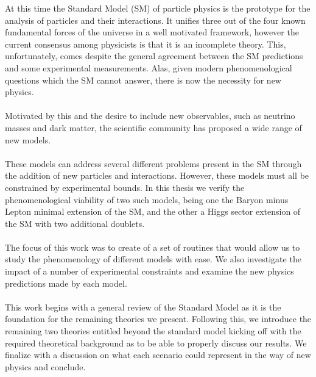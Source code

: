 \documentclass[10pt]{report}
\begin{document}
\TitlePage
\vspace*{55mm}
{At this time the Standard Model (SM) of particle physics is the prototype for the analysis of particles and their interactions. 
%
It unifies three out of the four known fundamental forces of the universe in a well motivated framework, however the current consensus among physicists is that it is an incomplete theory. 
%
This, unfortunately, comes despite the general agreement between the SM predictions and some experimental measurements. 
%
Alas, given modern phenomenological questions which the SM cannot answer, there is now the necessity for new physics.  
\\ \ \\ 
Motivated by this and the desire to include new observables, such as neutrino masses and dark matter, the scientific community has proposed a wide range of new models. 
\\ \ \\ 
These models can address several different problems present in the SM through the addition of new particles and interactions. 
% 
However, these models must all be constrained by experimental bounds. 
%
In this thesis we verify the phenomenological viability of two such models, being one the Baryon minus Lepton minimal extension of the SM, and the other a Higgs sector extension of the SM with two additional doublets. 
%
\\ \ \\ 
%
The focus of this work was to create of a set of routines that would allow us to study the phenomenology of different models with ease. 
%
We also investigate the impact of a number of experimental constraints and examine the new physics predictions made by each model. 
%
\\ \ \\ 
%
This work begins with a general review of the Standard Model as it is the foundation for the remaining theories we present.
%
Following this, we introduce the remaining two theories entitled beyond the standard model kicking off with the required theoretical background as to be able to properly discuss our results. 
%
We finalize with a discussion on what each scenario could represent in the way of new physics and conclude. 
}
\EndTitlePage
\titlepage\ \endtitlepage %

\tableofcontents

\cleardoublepage
\listoffigures

\cleardoublepage
\listoftables
\end{document}
